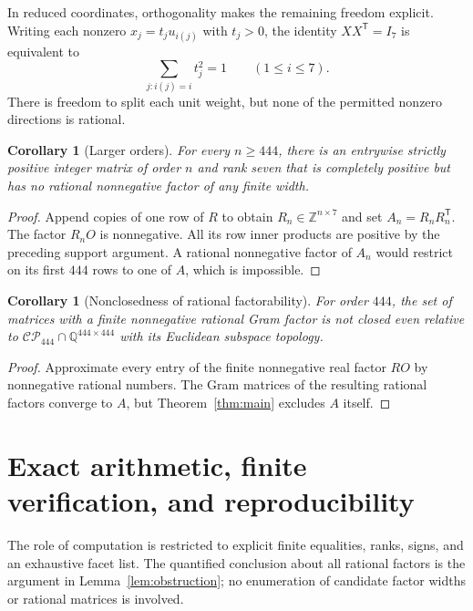 \documentclass[11pt]{article}
\newtheorem{corollary}[theorem]{Corollary}
\theoremstyle{definition}
\newcommand{\Q}{\mathbb Q}
\newcommand{\Z}{\mathbb Z}
\newcommand{\CP}{\mathcal{CP}}
\newcommand{\trans}{^{\mathsf T}}
\numberwithin{equation}{section}
\begin{document}
In reduced coordinates, orthogonality makes the remaining freedom explicit.
Writing each nonzero $x_j=t_j u_{i(j)}$ with $t_j>0$, the identity
$XX\trans=I_7$ is equivalent to
\[
 \sum_{j:i(j)=i}t_j^2=1\qquad(1\leq i\leq7).
\]
There is freedom to split each unit weight, but none of the permitted
nonzero directions is rational.

\begin{corollary}[Larger orders]\label{cor:padding}
For every $n\geq444$, there is an entrywise strictly positive integer
matrix of order $n$ and rank seven that is completely positive but has no
rational nonnegative factor of any finite width.
\end{corollary}
\begin{proof}
Append copies of one row of $R$ to obtain $R_n\in\Z^{n\times7}$ and set
$A_n=R_nR_n\trans$. The factor $R_nO$ is nonnegative. All its row inner
products are positive by the preceding support argument. A rational
nonnegative factor of $A_n$ would restrict on its first $444$ rows to one
of $A$, which is impossible.
\end{proof}

\begin{corollary}[Nonclosedness of rational factorability]
For order $444$, the set of matrices with a finite nonnegative rational
Gram factor is not closed even relative to
$\CP_{444}\cap\Q^{444\times444}$ with its Euclidean subspace topology.
\end{corollary}
\begin{proof}
Approximate every entry of the finite nonnegative real factor $RO$ by
nonnegative rational numbers. The Gram matrices of the resulting rational
factors converge to $A$, but Theorem~\ref{thm:main} excludes $A$ itself.
\end{proof}

\section{Exact arithmetic, finite verification, and reproducibility}
\label{sec:verification}
The role of computation is restricted to explicit finite equalities,
ranks, signs, and an exhaustive facet list. The quantified conclusion
about all rational factors is the argument in
Lemma~\ref{lem:obstruction}; no enumeration of candidate factor widths
or rational matrices is involved.
\end{document}
